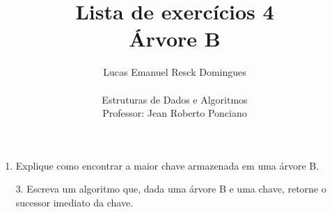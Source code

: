 \documentclass{article}
\title{Lista de exercícios 4 \\
\large Árvore B}
\author{Lucas Emanuel Resck Domingues \\ \\
Estruturas de Dados e Algoritmos \\
Professor: Jean Roberto Ponciano}
\begin{document}
    \maketitle

    \begin{enumerate}
        \item Explique como encontrar a maior chave armazenada em uma árvore B.
        
        \bigskip
        
        

        \bigskip

        \item[3.] Escreva um algoritmo que, dada uma árvore B e uma chave, retorne o sucessor imediato da chave.
        
        \bigskip
        
        

        \bigskip
    \end{enumerate}
\end{document}
